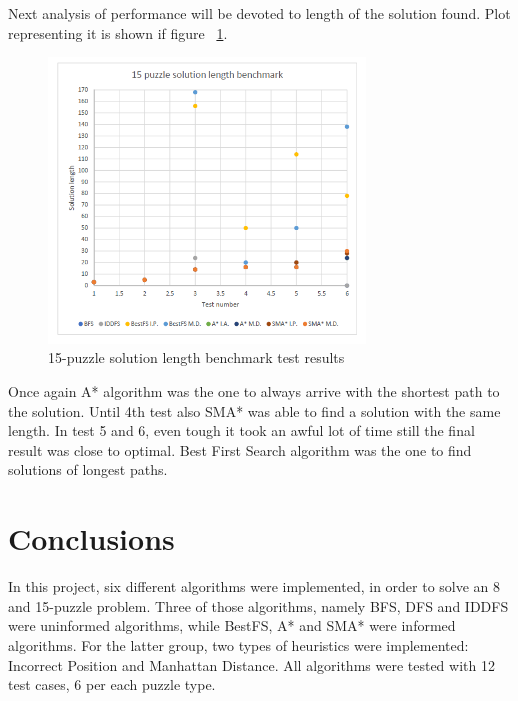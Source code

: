 \documentclass[12pt]{article}
\begin{document}
Next analysis of performance will be devoted to length of the solution found. Plot representing it is shown if figure  ~\ref{fifteen-puzzle-plot-length}.

 \begin{figure}[h]
    \includegraphics[width=0.75\textwidth]{15_puzzle_length}
    \centering
    \caption{15-puzzle solution length benchmark test results}
\label {fifteen-puzzle-plot-length}
\end{figure}

Once again A* algorithm was the one to always arrive with the shortest path to the solution. Until 4th test also SMA* was able to find a solution with the same length. In test 5 and 6, even tough it took an awful lot of time still the final result was close to optimal. Best First Search algorithm was the one to find solutions of longest paths.

\section {Conclusions}

In this project, six different algorithms were implemented, in order to solve an 8 and 15-puzzle problem. Three of those algorithms, namely BFS, DFS and IDDFS were uninformed algorithms, while BestFS, A* and SMA* were informed algorithms. For the latter group, two types of heuristics were implemented: Incorrect Position and Manhattan Distance. All algorithms were tested with 12 test cases, 6 per each puzzle type.
\end{document}
